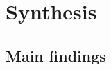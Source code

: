 	
\chapter{Synthesis}
\label{chap:synth}
\newpage



\section{Main findings}
\label{sec:synth:mainfind}












